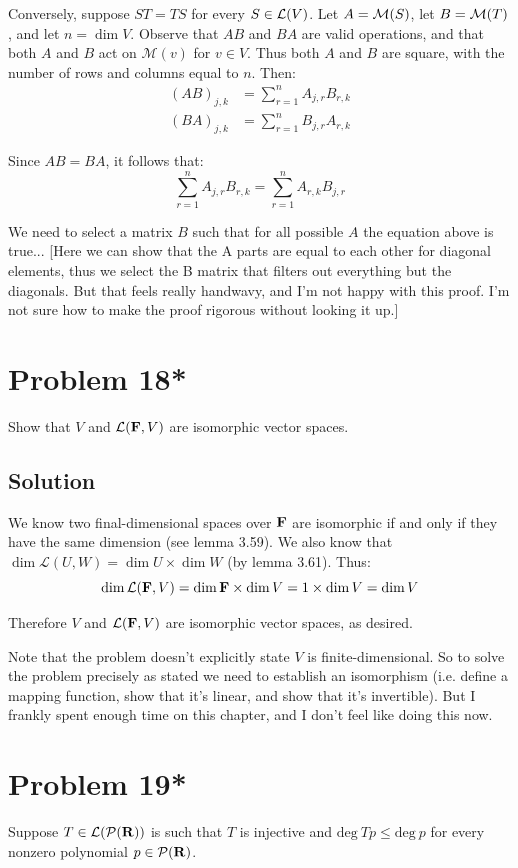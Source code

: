 \documentclass{article}
\begin{document}
\vs

Conversely, suppose $ST=TS$ for every $S\in\Lo(V)$. Let $A=\M(S)$, let $B=\M(T)$, and let $n=\dim V$. Observe that $AB$ and $BA$ are valid operations, and that both $A$ and $B$ act on $\mathcal{M}(v)$  for $v\in V$. Thus both $A$ and $B$ are square, with the number of rows and columns equal to $n$. Then:
\begin{align*}
(AB)_{j,k}&=\sum_{r=1}^{n}A_{j,r}B_{r,k}\\
(BA)_{j,k}&=\sum_{r=1}^{n}B_{j,r}A_{r,k}
\end{align*}

Since $AB=BA$, it follows that:
\[\sum_{r=1}^{n}A_{j,r}B_{r,k}=\sum_{r=1}^{n}A_{r,k}B_{j,r}\]

We need to select a matrix $B$ such that for all possible $A$ the equation above is true... [Here we can show that the A parts are equal to each other for diagonal elements, thus we select the B matrix that filters out everything but the diagonals. But that feels really handwavy, and I'm not happy with this proof. I'm not sure how to make the proof rigorous without looking it up.]

\section*{Problem 18*}
Show that $V$ and $\mathcal{L}(\mathbf{F},V)$ are isomorphic vector spaces.

\subsection*{Solution}
We know two final-dimensional spaces over $\mathbf{F}$ are isomorphic if and only if they have the same dimension (see lemma 3.59). We also know that $\dim\mathcal{L}(U,W)=\dim U\times\dim W$ (by lemma 3.61). Thus:
\[\dim\mathcal{L}(\mathbf{F},V)=\dim \mathbf{F}\times\dim V=1\times\dim V=\dim V\]

Therefore $V$ and $\mathcal{L}(\mathbf{F},V)$ are isomorphic vector spaces, as desired.

\vs

Note that the problem doesn't explicitly state $V$ is finite-dimensional. So to solve the problem precisely as stated we need to establish an isomorphism (i.e. define a mapping function, show that it's linear, and show that it's invertible). But I frankly spent enough time on this chapter, and I don't feel like doing this now.

\newpage
\section*{Problem 19*}
Suppose $T\in\Lo(\mathcal{P}(\R))$ is such that $T$ is injective and $\text{deg}\ Tp\leq \text{deg}\ p$ for every nonzero polynomial $p\in\mathcal{P}(\mathbf{R})$.
\end{document}

